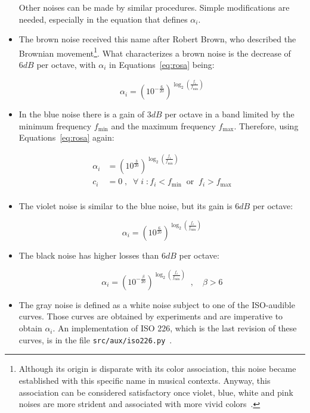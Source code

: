 \begin{itemize}
Other noises can be made by similar procedures. Simple modifications are needed, especially in the equation that defines $\alpha_i$.

  \item The brown noise received this name after Robert Brown, who described the Brownian movement\footnote{Although
	  its origin is disparate with its color association, this noise became established with this specific name in musical contexts. Anyway, this association can be considered satisfactory once violet, blue, white and pink noises are more strident and associated with more vivid colors~\cite{Cook,guillaume}.}. What characterizes a brown noise is the decrease of $6dB$ per octave, with $\alpha_i$ in Equations~\ref{eq:rosa} being:

\begin{equation}\label{eq:marrom}
 \alpha_i=(10^{-\frac{6}{20}})^{\log _2 \left( \frac{f_i}{f_{\text{min}}} \right )}
\end{equation}

 \item In the blue noise there is a gain of $3dB$ per octave in a band limited by the minimum frequency $f_{\text{min}}$ and the maximum frequency $f_{\text{max}}$.
	 Therefore, using Equations~\ref{eq:rosa} again:

\begin{equation}\label{eq:azul}
 \begin{split}
 \alpha_i & = (10^{\frac{3}{20}})^{\log _2 \left ( \frac{f_i}{f_{\text{min}}} \right )} \\
 c_i & =0\;,\;\; \forall \; i \; : f_i<f_{\text{min}} \;\; \text{or} \;\; f_i>f_{\text{max}} \\
 \end{split}
\end{equation}

 \item The violet noise is similar to the blue noise, but its gain is $6dB$ per octave:

\begin{equation}\label{eq:violeta}
 \alpha_i = (10^{\frac{6}{20}})^{\log _2 \left ( \frac{f_i}{f_{\text{min}}} \right )}
\end{equation}

 \item The black noise has higher losses than $6dB$ per octave:

\begin{equation}\label{eq:preto}
 \alpha_i=(10^{-\frac{\beta}{20}})^{\log _2 \left( \frac{f_i}{f_{\text{min}}} \right )}\;\;, \quad \beta > 6
\end{equation}

 \item The gray noise is defined as a white noise subject to one of the ISO-audible curves. Those curves are obtained by experiments and are imperative to obtain $\alpha_i$. An implementation of ISO 226, which is the last revision of these curves, is in the file \texttt{src/aux/iso226.py}~\cite{MASSA}.
\end{itemize}

